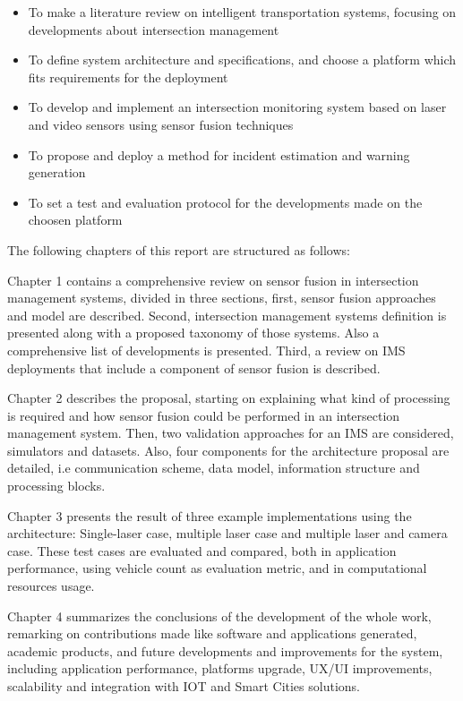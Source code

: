 \begin{itemize}
\item To make a literature review on intelligent transportation systems, focusing on developments about intersection management
\item To define system architecture and specifications, and choose a platform which fits requirements for the deployment
\item To develop and implement an intersection monitoring system based on laser and video sensors using sensor fusion techniques
\item To propose and deploy a method for incident estimation and warning generation
\item To set a test and evaluation protocol for the developments made on the choosen platform 
\end{itemize}


The following chapters of this report are structured as follows:

Chapter 1 contains a comprehensive review on sensor fusion in intersection management systems, divided in three sections, first, sensor fusion approaches and model are described. Second, intersection management systems definition is presented along with a proposed taxonomy of those systems. Also a comprehensive list of developments is presented. Third, a review on IMS deployments that include a component of sensor fusion is described.

Chapter 2 describes the proposal, starting on explaining what kind of processing is required and how sensor fusion could be performed in an intersection management system. Then, two validation approaches for an IMS are considered, simulators and datasets. Also, four components for the architecture proposal are detailed, i.e communication scheme, data model, information structure and processing blocks.

Chapter 3 presents the result of three example implementations using the architecture: Single-laser case, multiple laser case and multiple laser and camera case. These test cases are evaluated and compared, both in application performance, using vehicle count as evaluation metric, and in computational resources usage.

Chapter 4 summarizes the conclusions of the development of the whole work, remarking on contributions made like software and applications generated, academic products, and future developments and improvements for the system, including application performance, platforms upgrade, UX/UI improvements, scalability and integration with IOT and Smart Cities solutions.
